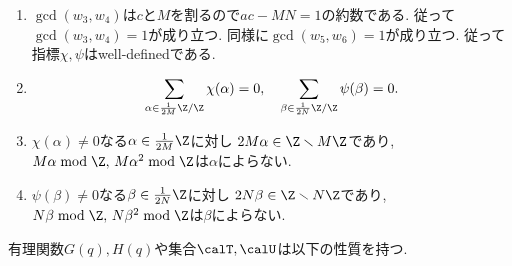 \documentclass[11pt,b5paper,oneside,lualatex]{ltjsarticle} %
\numberwithin{equation}{section} %
\begin{document}
\begin{rem} \label{rem:veps_property}
	\begin{enumerate}
		\item \label{item:rem:veps_property_det}
		$ \gcd(w_3, w_4) $は$ c $と$ M $を割るので$ ac - MN = 1 $の約数である. 
		従って$ \gcd(w_3, w_4) = 1 $が成り立つ. 
		同様に$ \gcd(w_5, w_6) = 1 $が成り立つ. 
		従って指標$ \chi, \psi $はwell-definedである. 
		\item \label{item:rem:veps_property_zero}
		\[
		\sum_{\alpha \in \frac{1}{2M}\Z/\Z} \chi(\alpha) = 0, \quad
		\sum_{\beta \in \frac{1}{2N}\Z/\Z} \psi(\beta) = 0.
		\]
		\item \label{item:rem:veps_property_chi}
		$ \chi(\alpha) \neq 0 $なる$ \alpha \in \frac{1}{2M}\Z $に対し
		$ 2M \alpha \in \Z \smallsetminus M\Z $であり, $ M\alpha \bmod \Z, \, M\alpha^2 \bmod \Z $は$ \alpha $によらない. 
		\item \label{item:rem:veps_property_psi}
		$ \psi(\beta) \neq 0 $なる$ \beta \in \frac{1}{2N}\Z $に対し
		$ 2N \beta \in \Z \smallsetminus N\Z $であり, $ N\beta \bmod \Z, \, N\beta^2 \bmod \Z $は$ \beta $によらない. 
	\end{enumerate}
\end{rem}

有理関数$ G(q), H(q) $や集合$ \calT, \calU $は以下の性質を持つ. 
\end{document}
